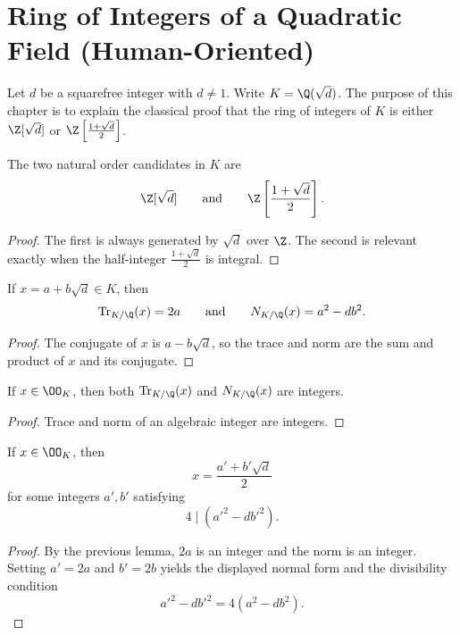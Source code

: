 \chapter{Ring of Integers of a Quadratic Field (Human-Oriented)}

Let $d$ be a squarefree integer with $d \neq 1$. Write
$K = \Q(\sqrt{d})$.
The purpose of this chapter is to explain the classical proof that the ring of
integers of $K$ is either $\Z[\sqrt{d}]$ or
$\Z\left[\frac{1 + \sqrt{d}}{2}\right]$.

\begin{human_lemma}\label{human_orders}
  The two natural order candidates in $K$ are
  \[
  \Z[\sqrt{d}]
  \qquad\text{and}\qquad
  \Z\left[\frac{1+\sqrt{d}}{2}\right].
  \]
\end{human_lemma}
\begin{proof}
  The first is always generated by $\sqrt{d}$ over $\Z$.
  The second is relevant exactly when the half-integer
  $\frac{1+\sqrt{d}}{2}$ is integral.
\end{proof}

\begin{human_lemma}\label{human_trace_norm}
  If $x = a + b\sqrt{d} \in K$, then
  \[
  \mathrm{Tr}_{K/\Q}(x) = 2a
  \qquad\text{and}\qquad
  N_{K/\Q}(x) = a^2 - db^2.
  \]
\end{human_lemma}
\begin{proof}
  The conjugate of $x$ is $a - b\sqrt{d}$, so the trace and norm are the sum
  and product of $x$ and its conjugate.
\end{proof}

\begin{human_lemma}\label{human_integral_trace_norm}
  If $x \in \OO_K$, then both $\mathrm{Tr}_{K/\Q}(x)$ and $N_{K/\Q}(x)$ are integers.
\end{human_lemma}
\begin{proof}
  Trace and norm of an algebraic integer are integers.
\end{proof}

\begin{human_lemma}\label{human_half_int}
  If $x \in \OO_K$, then
  \[
  x = \frac{a' + b' \sqrt{d}}{2}
  \]
  for some integers $a', b'$ satisfying
  \[
  4 \mid (a'^2 - d b'^2).
  \]
\end{human_lemma}
\begin{proof}
  By the previous lemma, $2a$ is an integer and the norm is an integer.
  Setting $a' = 2a$ and $b' = 2b$ yields the displayed normal form and the
  divisibility condition
  \[
  a'^2 - d b'^2 = 4(a^2 - db^2).
  \]
\end{proof}

